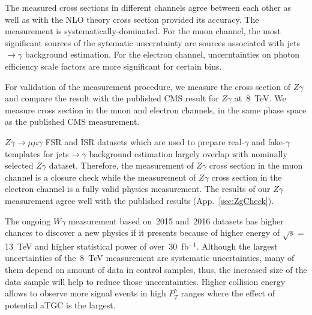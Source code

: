  The measured cross sections in different channels agree between each other as well as with the NLO theory cross section provided its accuracy. The measurement is systematically-dominated. For the muon channel, the most significant sources of the sytematic uncerntainty are sources associated with jets$\rightarrow\gamma$ background estimation. For the electron channel, uncerntainties on photon efficiency scale factors are more significant for certain bins.

For validation of the measurement procedure, we measure the cross section of $Z\gamma$ and compare the result with the published CMS result for $Z\gamma$ at~8~TeV. We measure cross section in the muon and electron channels, in the same phase space as the published CMS measurement. 

$Z\gamma\rightarrow\mu\mu\gamma$ FSR and ISR datasets which are used to prepare real-$\gamma$ and fake-$\gamma$ templates for jets$\rightarrow\gamma$ background estimation largely overlap with nominally selected $Z\gamma$ dataset. Therefore, the measurement of $Z\gamma$ cross section in the muon channel is a closure check while the measurement of $Z\gamma$ cross section in the electron channel is a fully valid physics measurement. The results of our $Z\gamma$ measurement agree well with the published results (App.~\ref{sec:ZgCheck}).

The ongoing $W\gamma$ measurement based on~2015 and~2016 datasets has higher chances to discover a new physics if it presents because of higher energy of $\sqrt{s}=$13~TeV and higher statistical power of over~30~fb$^{-1}$. Although the largest uncertainties of the~8~TeV measurement are systematic uncertainties, many of them depend on amount of data in control samples, thus, the increased size of the data sample will help to reduce those uncerntainties. Higher collision energy allows to observe more signal events in high $P_T^{\gamma}$ ranges where the effect of potential aTGC is the largest. 


